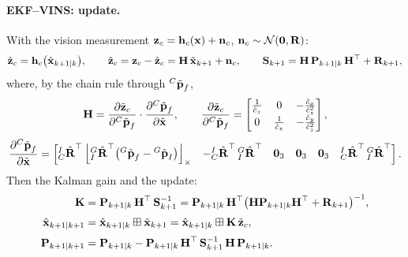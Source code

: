 \paragraph{EKF--VINS: update.} With the vision measurement $\vect{z}_c = \vect{h}_c(\vect{x}) + \vect{n}_c$, $\vect{n}_c \sim \mathcal{N}(\vect{0}, \vect{R})$:
\begin{align}
\hat{\vect{z}}_c = \vect{h}_c\big(\hat{\vect{x}}_{k+1|k}\big),
\qquad
\tilde{\vect{z}}_c = \vect{z}_c - \hat{\vect{z}}_c = \vect{H}\,\tilde{\vect{x}}_{k+1} + \vect{n}_c,
\qquad
\vect{S}_{k+1} = \vect{H}\,\vect{P}_{k+1|k}\,\vect{H}\trans + \vect{R}_{k+1},
\end{align}
where, by the chain rule through ${}^{C}\tilde{\vect{p}}_f$,
\begin{align}
\vect{H} = \frac{\partial\tilde{\vect{z}}_c}{\partial{}^{C}\tilde{\vect{p}}_f}
\cdot \frac{\partial{}^{C}\tilde{\vect{p}}_f}{\partial\tilde{\vect{x}}},
\qquad
\frac{\partial\tilde{\vect{z}}_c}{\partial{}^{C}\tilde{\vect{p}}_f}
= \begin{bmatrix}
\frac{1}{\hat{c}_z} & 0 & -\frac{\hat{c}_x}{\hat{c}_z^2} \\[2pt]
0 & \frac{1}{\hat{c}_z} & -\frac{\hat{c}_y}{\hat{c}_z^2}
\end{bmatrix},
\end{align}
\begingroup
\small
\setlength{\arraycolsep}{3pt}
\begin{align}
\frac{\partial{}^{C}\tilde{\vect{p}}_f}{\partial\tilde{\vect{x}}}
= \begin{bmatrix}
{}^{I}_{C}\hat{\vect{R}}\trans\skewsym{{}^{G}_{I}\hat{\vect{R}}\trans\big({}^{G}\hat{\vect{p}}_f - {}^{G}\hat{\vect{p}}_I\big)} &
-{}^{I}_{C}\hat{\vect{R}}\trans\,{}^{G}_{I}\hat{\vect{R}}\trans &
\vect{0}_3 & \vect{0}_3 & \vect{0}_3 &
{}^{I}_{C}\hat{\vect{R}}\trans\,{}^{G}_{I}\hat{\vect{R}}\trans
\end{bmatrix}.
\label{eq:lec06-H-vins}
\end{align}
\endgroup
Then the Kalman gain and the update:
\begin{align}
\vect{K} &= \vect{P}_{k+1|k}\,\vect{H}\trans\,\vect{S}_{k+1}^{-1}
= \vect{P}_{k+1|k}\,\vect{H}\trans\big(\vect{H}\vect{P}_{k+1|k}\vect{H}\trans + \vect{R}_{k+1}\big)^{-1}, \\[2pt]
\hat{\vect{x}}_{k+1|k+1} &= \hat{\vect{x}}_{k+1|k} \boxplus \tilde{\vect{x}}_{k+1}
= \hat{\vect{x}}_{k+1|k} \boxplus \vect{K}\,\tilde{\vect{z}}_c, \\[2pt]
\vect{P}_{k+1|k+1} &= \vect{P}_{k+1|k} - \vect{P}_{k+1|k}\,\vect{H}\trans\,\vect{S}_{k+1}^{-1}\,\vect{H}\,\vect{P}_{k+1|k}.
\end{align}

